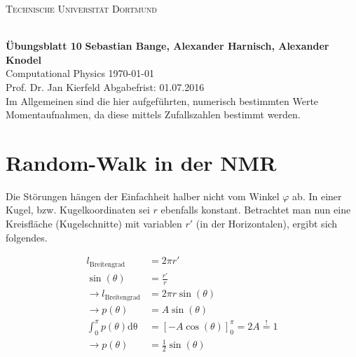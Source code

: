 
\usepackage{verbatim}
\usepackage{ulem}
\usepackage{braket}
\newcommand\OverfullCenter[1]{\noindent\makebox[\linewidth]{#1}}

\noindent
\centerline{\small{\textsc{Technische Universität Dortmund}}} \\
\large\textbf{Übungsblatt 10} \hfill \footnotesize\textbf{Sebastian Bange, Alexander Harnisch, Alexander Knodel} \\
\normalsize Computational Physics \hfill \today \\
Prof. Dr. Jan Kierfeld \hfill Abgabefrist: 01.07.2016\\
\noindent\makebox[\linewidth]{\rule{\textwidth}{0.4pt}}
Im Allgemeinen sind die hier aufgeführten, numerisch bestimmten Werte Momentaufnahmen, da diese mittels Zufallszahlen bestimmt werden.
\section*{Random-Walk in der NMR}
Die Störungen hängen der Einfachheit halber nicht vom Winkel $\varphi$ ab. In einer Kugel, bzw. Kugelkoordinaten sei $r$ ebenfalls konstant. Betrachtet man nun eine Kreisfläche (Kugelschnitte) mit variablen $r'$ (in der Horizontalen), ergibt sich folgendes.

\begin{align}
	l_{\text{Breitengrad}} &= 2\pi r' \\
	\sin(\theta) &= \frac{r'}{r} \\
	\rightarrow l_{\text{Breitengrad}} &= 2\pi r \sin(\theta) \\
	\rightarrow p(\theta) &= A \sin(\theta)\\
	\int_0^{\pi} p(\theta) \mathup{d\theta} &= \left[-A\cos(\theta)\right]_0^{\pi} = 2A \stackrel{!}{=} 1 \\
	\rightarrow p(\theta) &= \frac{1}{2} \sin(\theta)
\end{align}

